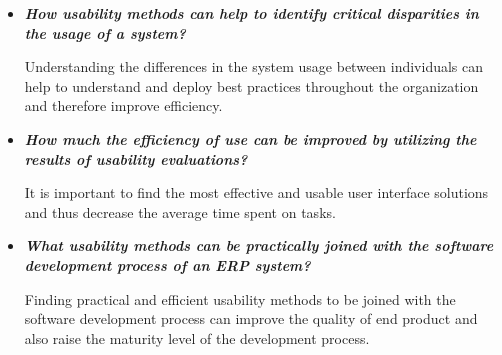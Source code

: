 \documentclass[12pt,a4paper,oneside,pdftex]{report}
\begin{document}
\begin{itemize}
\item \textbf{\emph{How usability methods can help to identify critical disparities in the usage of a system?}}

Understanding the differences in the system usage between individuals can help to understand and deploy best practices throughout the organization and therefore improve efficiency.

\item \textbf{\emph{How much the efficiency of use can be improved by utilizing the results of usability evaluations?}}

It is important to find the most effective and usable user interface solutions and thus decrease the average time spent on tasks. 

\item \textbf{\emph{What usability methods can be practically joined with the software development process of an ERP system?}}

Finding practical and efficient usability methods to be joined with the software development process can improve the quality of end product and also raise the maturity level of the development process.

\end{itemize}




\end{document}
